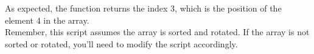 \documentclass[preview]{standalone}
\begin{document}
As expected, the function returns the index 3, which is the position of the element 4 in the array.\\Remember, this script assumes the array is sorted and rotated. If the array is not sorted or rotated, you'll need to modify the script accordingly.\\
\end{document}
